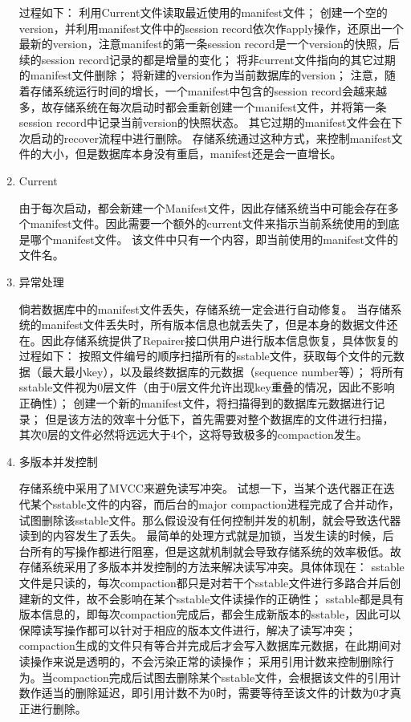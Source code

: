 \begin{enumerate}
过程如下：
利用Current文件读取最近使用的manifest文件；
创建一个空的version，并利用manifest文件中的session record依次作apply操作，还原出一个最新的version，注意manifest的第一条session record是一个version的快照，后续的session record记录的都是增量的变化；
将非current文件指向的其它过期的manifest文件删除；
将新建的version作为当前数据库的version；
注意，随着存储系统运行时间的增长，一个manifest中包含的session record会越来越多，故存储系统在每次启动时都会重新创建一个manifest文件，并将第一条session record中记录当前version的快照状态。
其它过期的manifest文件会在下次启动的recover流程中进行删除。
存储系统通过这种方式，来控制manifest文件的大小，但是数据库本身没有重启，manifest还是会一直增长。


		\item Current

由于每次启动，都会新建一个Manifest文件，因此存储系统当中可能会存在多个manifest文件。因此需要一个额外的current文件来指示当前系统使用的到底是哪个manifest文件。
该文件中只有一个内容，即当前使用的manifest文件的文件名。

		\item 异常处理

倘若数据库中的manifest文件丢失，存储系统一定会进行自动修复。
当存储系统的manifest文件丢失时，所有版本信息也就丢失了，但是本身的数据文件还在。因此存储系统提供了Repairer接口供用户进行版本信息恢复，具体恢复的过程如下：
按照文件编号的顺序扫描所有的sstable文件，获取每个文件的元数据（最大最小key），以及最终数据库的元数据（sequence number等）；
将所有sstable文件视为0层文件（由于0层文件允许出现key重叠的情况，因此不影响正确性）；
创建一个新的manifest文件，将扫描得到的数据库元数据进行记录；
但是该方法的效率十分低下，首先需要对整个数据库的文件进行扫描，其次0层的文件必然将远远大于4个，这将导致极多的compaction发生。

		\item 多版本并发控制

存储系统中采用了MVCC来避免读写冲突。
试想一下，当某个迭代器正在迭代某个sstable文件的内容，而后台的major compaction进程完成了合并动作，试图删除该sstable文件。那么假设没有任何控制并发的机制，就会导致迭代器读到的内容发生了丢失。
最简单的处理方式就是加锁，当发生读的时候，后台所有的写操作都进行阻塞，但是这就机制就会导致存储系统的效率极低。故存储系统采用了多版本并发控制的方法来解决读写冲突。具体体现在：
sstable文件是只读的，每次compaction都只是对若干个sstable文件进行多路合并后创建新的文件，故不会影响在某个sstable文件读操作的正确性；
sstable都是具有版本信息的，即每次compaction完成后，都会生成新版本的sstable，因此可以保障读写操作都可以针对于相应的版本文件进行，解决了读写冲突；
compaction生成的文件只有等合并完成后才会写入数据库元数据，在此期间对读操作来说是透明的，不会污染正常的读操作；
采用引用计数来控制删除行为。当compaction完成后试图去删除某个sstable文件，会根据该文件的引用计数作适当的删除延迟，即引用计数不为0时，需要等待至该文件的计数为0才真正进行删除。

\end{enumerate}


